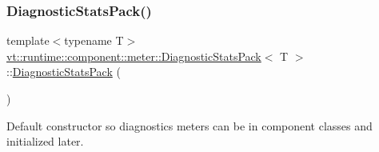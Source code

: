 \subsubsection{\texorpdfstring{Diagnostic\+Stats\+Pack()}{DiagnosticStatsPack()}\hspace{0.1cm}{\footnotesize\ttfamily [1/2]}}
{\footnotesize\ttfamily template$<$typename T$>$ \\
\hyperlink{structvt_1_1runtime_1_1component_1_1meter_1_1_diagnostic_stats_pack}{vt\+::runtime\+::component\+::meter\+::\+Diagnostic\+Stats\+Pack}$<$ T $>$\+::\hyperlink{structvt_1_1runtime_1_1component_1_1meter_1_1_diagnostic_stats_pack}{Diagnostic\+Stats\+Pack} (\begin{DoxyParamCaption}{ }\end{DoxyParamCaption})\hspace{0.3cm}{\ttfamily [default]}}



Default constructor so diagnostics meters can be in component classes and initialized later. 

\mbox{\label{structvt_1_1runtime_1_1component_1_1meter_1_1_diagnostic_stats_pack_a849682d9001fa90617a6a505b0cf3f17}} 
